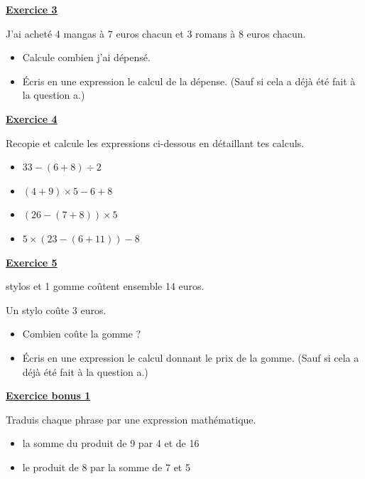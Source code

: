 \documentclass[13pt]{extarticle}
\newcommand{\exo}[1]{%
  \vspace{0.8em}%
  \noindent\large\underline{\textbf{Exercice #1}}%
  \vspace{0.2em}\par%
}
\newcommand{\exobonus}[1]{%
  \vspace{0.8em}%
  \noindent\large\underline{\textbf{Exercice bonus #1}}%
  \vspace{0.2em}\par%
}
\begin{document}
\exo{3}

\noindent J'ai acheté 4 mangas à 7 euros chacun et 3 romans à 8 euros chacun.

\begin{itemize}
  \item[a)] Calcule combien j'ai dépensé.
  \item[b)] Écris en une expression le calcul de la dépense. (Sauf si cela a déjà été fait à la question a.)
\end{itemize}

\exo{4}

\noindent Recopie et calcule les expressions ci-dessous en détaillant tes calculs.

\begin{itemize}
  \item[a)] $33 - (6 + 8) \div 2$
  \item[b)] $(4 + 9) \times 5 - 6 + 8$
  \item[c)] $(26 - (7 + 8)) \times 5$
  \item[d)] $5 \times (23 - (6 + 11)) - 8$
\end{itemize}

\newpage

\exo{5}

 stylos et 1 gomme coûtent ensemble 14 euros.

\noindent Un stylo coûte 3 euros.

\begin{itemize}
  \item[a)] Combien coûte la gomme ?
  \item[b)] Écris en une expression le calcul donnant le prix de la gomme. (Sauf si cela a déjà été fait à la question a.)
\end{itemize}

\exobonus{1}

\noindent Traduis chaque phrase par une expression mathématique.

\begin{itemize}
  \item[a)] la somme du produit de 9 par 4 et de 16
  \item[b)] le produit de 8 par la somme de 7 et 5
\end{itemize}
\end{document}
